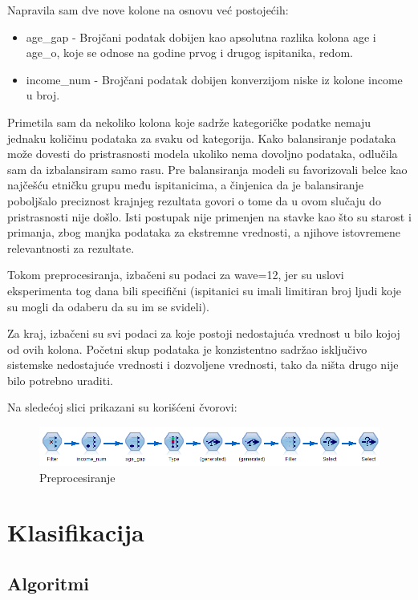 \documentclass{article}
\begin{document}
Napravila sam dve nove kolone na osnovu već postojećih:

\begin{itemize}
    \item age\_gap - Brojčani podatak dobijen kao apsolutna razlika kolona age i age\_o, koje se odnose na godine prvog i drugog ispitanika, redom.
    \item income\_num - Brojčani podatak dobijen konverzijom niske iz kolone income u broj.
\end{itemize}

Primetila sam da nekoliko kolona koje sadrže kategoričke podatke nemaju jednaku količinu podataka za svaku od kategorija. Kako balansiranje podataka može dovesti do pristrasnosti modela ukoliko nema dovoljno podataka, odlučila sam da izbalansiram samo rasu. Pre balansiranja modeli su favorizovali belce kao najčešću etničku grupu među ispitanicima, a činjenica da je balansiranje poboljšalo preciznost krajnjeg rezultata govori o tome da u ovom slučaju do pristrasnosti nije došlo. Isti postupak nije primenjen na stavke kao što su starost i primanja, zbog manjka podataka za ekstremne vrednosti, a njihove istovremene relevantnosti za rezultate.\par
Tokom preprocesiranja, izbačeni su podaci za wave=12, jer su uslovi eksperimenta tog dana bili specifični (ispitanici su imali limitiran broj ljudi koje su mogli da odaberu da su im se svideli).\par
Za kraj, izbačeni su svi podaci za koje postoji nedostajuća vrednost u bilo kojoj od ovih kolona. Početni skup podataka je konzistentno sadržao isključivo sistemske nedostajuće vrednosti i dozvoljene vrednosti, tako da ništa drugo nije bilo potrebno uraditi.\par
Na sledećoj slici prikazani su korišćeni čvorovi:\\
\begin{figure}[h!]
\centering
\includegraphics[scale=0.4]{graphics/preprocessing.png}
\caption{Preprocesiranje}
\label{fig:preprocesiranje}
\end{figure}

\section{Klasifikacija}
\subsection{Algoritmi}
\end{document}

